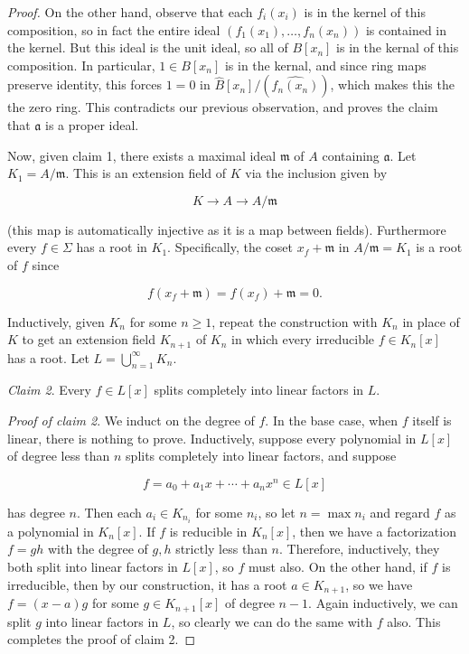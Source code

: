 \documentclass{amsart}
\begin{document}
\begin{proof}
On the other hand, observe that each $ f_i(x_i)$ is in the kernel of this composition, so in fact the entire ideal $ (f_1(x_1), \dotsc, f_n(x_n))$ is contained in the kernel. But this ideal is the unit ideal, so all of $ B[x_n]$ is in the kernal of this composition. In particular, $ 1 \in B[x_n]$ is in the kernal, and since ring maps preserve identity, this forces $ 1 = 0$ in $ \hat{B}[x_n]/(\widehat{f_n(x_n)})$, which makes this the the zero ring. This contradicts our previous observation, and proves the claim that $ \mathfrak{a}$ is a proper ideal.

Now, given claim 1, there exists a maximal ideal $ \mathfrak{m}$ of $ A$ containing $ \mathfrak{a}$. Let $ K_1 = A/\mathfrak{m}$. This is an extension field of $ K$ via the inclusion given by

\[ K \to A \to A/\mathfrak{m} \]

(this map is automatically injective as it is a map between fields). Furthermore every $ f \in \Sigma$ has a root in $ K_1$. Specifically, the coset $ x_f + \mathfrak{m}$ in $ A/\mathfrak{m} = K_1$ is a root of $ f$ since

\[ f(x_f + \mathfrak{m}) = f(x_f) + \mathfrak{m} = 0. \]

Inductively, given $ K_n$ for some $ n \geq 1$, repeat the construction with $ K_n$ in place of $ K$ to get an extension field $ K_{n+1}$ of $ K_n$ in which every irreducible $ f \in K_n[x]$ has a root. Let $ L = \bigcup_{n = 1}^{\infty} K_n$.

\emph{Claim 2}. Every $ f \in L[x]$ splits completely into linear factors in $ L$.

\emph{Proof of claim 2}. We induct on the degree of $ f$. In the base case, when $ f$ itself is linear, there is nothing to prove. Inductively, suppose every polynomial in $ L[x]$ of degree less than $ n$ splits completely into linear factors, and suppose

\[ f = a_0 + a_1x + \dotsb + a_nx^n \in L[x] \]

has degree $ n$. Then each $ a_i \in K_{n_i}$ for some $ n_i$, so let $ n = \max n_i$ and regard $ f$ as a polynomial in $ K_n[x]$. If $ f$ is reducible in $ K_n[x]$, then we have a factorization $ f = gh$ with the degree of $ g, h$ strictly less than $ n$. Therefore, inductively, they both split into linear factors in $ L[x]$, so $ f$ must also. On the other hand, if $ f$ is irreducible, then by our construction, it has a root $ a\in K_{n+1}$, so we have $ f = (x - a) g$ for some $ g \in K_{n+1}[x]$ of degree $ n - 1$. Again inductively, we can split $ g$ into linear factors in $ L$, so clearly we can do the same with $ f$ also. This completes the proof of claim 2.


\end{proof}
\end{document}

